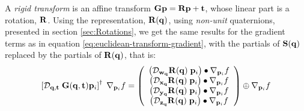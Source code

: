 A {\it rigid transform} is an affine transform
${\mathbf G} {\mathbf p}  = {\mathbf R} {\mathbf p} + {\mathbf t} $,
whose linear part is a rotation, ${\mathbf R}$.
Using the representation, ${\mathbf R}({\mathbf q})$,
using {\em non-unit} quaternions,
presented in section \ref{sec:Rotations},
we get the same results for the gradient terms
as in equation \ref{eq:euclidean-transform-gradient},
with the partials of ${\mathbf S}({\mathbf q})$ replaced by the
partials of ${\mathbf R}({\mathbf q})$, that is:
\begin{equation}
\label{eq:rigid-transform-gradient}
\left[
\Df{\q,\t}{\; \G(\q,\t)\p_i}
\right]^{\dagger} \;
\Gf{\p_i}{f}
=
\left(
\begin{array}{c}
\left( \Df{\w_{\q}}{\R(\q)} \; \p_i \right) \bullet \Gf{\p_i}{f} \\
\left( \Df{\x_{\q}}{\R(\q)} \; \p_i \right) \bullet \Gf{\p_i}{f} \\
\left( \Df{\y_{\q}}{\R(\q)} \; \p_i \right) \bullet \Gf{\p_i}{f} \\
\left( \Df{\z_{\q}}{\R(\q)} \; \p_i \right) \bullet \Gf{\p_i}{f} \\
\end{array}
\right)
\oplus
\Gf{\p_i}{f}
\end{equation}
